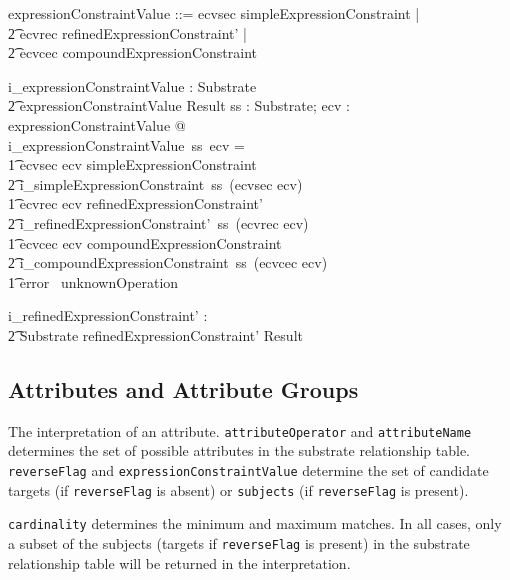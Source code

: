 \documentclass{article}
\def\spec#1{{\tt #1}}
\begin{document}
\begin{zed}
expressionConstraintValue ::= ecvsec \ldata simpleExpressionConstraint \rdata | \\
\t2 ecvrec \ldata refinedExpressionConstraint' \rdata | \\
\t2 ecvcec \ldata compoundExpressionConstraint \rdata \\
[refinedExpressionConstraint']
\end{zed}
\begin{gendef}
   i\_expressionConstraintValue : Substrate \fun \\
\t2 expressionConstraintValue \fun Result
\where
   \forall ss : Substrate; ecv : expressionConstraintValue @  \\
   i\_expressionConstraintValue~ss~ecv = \\
\t1 \IF ecvsec \inv ecv \in simpleExpressionConstraint \\
\t2 \THEN i\_simpleExpressionConstraint~ss~(ecvsec \inv ecv) \\
\t1 \ELSE \IF ecvrec \inv ecv \in refinedExpressionConstraint' \\ 
\t2 \THEN i\_refinedExpressionConstraint'~ss~(ecvrec \inv ecv) \\
\t1 \ELSE \IF ecvcec \inv ecv \in compoundExpressionConstraint \\ 
\t2 \THEN i\_compoundExpressionConstraint~ss~(ecvcec \inv ecv) \\
\t1 \ELSE error~ unknownOperation
\end{gendef}

\begin{gendef}
   i\_refinedExpressionConstraint' : \\
\t2 Substrate \pfun refinedExpressionConstraint' \pfun Result
\end{gendef}




\subsection{Attributes and Attribute Groups}
The interpretation of an attribute.  \spec{attributeOperator} and \spec{attributeName}
determines the set of possible attributes in the substrate relationship table.  \spec{reverseFlag} and
\spec{expressionConstraintValue} determine the set of candidate targets (if \spec{reverseFlag}
is absent) or \spec{subjects} (if \spec{reverseFlag} is present).

\spec{cardinality} determines the minimum and maximum matches.  In all cases, only a subset of the subjects 
(targets if \spec{reverseFlag} is present) in the substrate relationship table will be returned in the interpretation.
\end{document}
